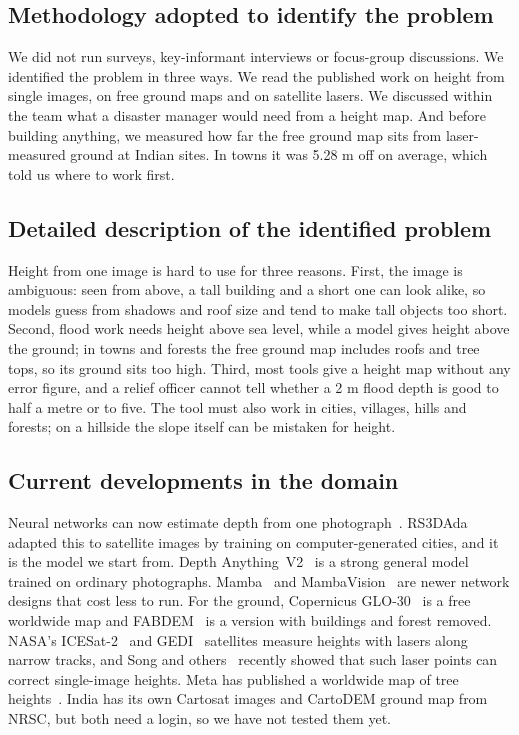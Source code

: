 \documentclass[11pt,a4paper]{article}
\newcommand{\m}{\ifmmode\,\mathrm{m}\else\,m\fi}
\begin{document}
\subsection{Methodology adopted to identify the problem}
We did not run surveys, key-informant interviews or focus-group discussions. We identified the problem in three ways. We read the published work on height from single images, on free ground maps and on satellite lasers. We discussed within the team what a disaster manager would need from a height map. And before building anything, we measured how far the free ground map sits from laser-measured ground at Indian sites. In towns it was 5.28\m{} off on average, which told us where to work first.

\subsection{Detailed description of the identified problem}
Height from one image is hard to use for three reasons. First, the image is ambiguous: seen from above, a tall building and a short one can look alike, so models guess from shadows and roof size and tend to make tall objects too short. Second, flood work needs height above sea level, while a model gives height above the ground; in towns and forests the free ground map includes roofs and tree tops, so its ground sits too high. Third, most tools give a height map without any error figure, and a relief officer cannot tell whether a 2\m{} flood depth is good to half a metre or to five.
The tool must also work in cities, villages, hills and forests; on a hillside the slope itself can be mistaken for height.

\subsection{Current developments in the domain}
Neural networks can now estimate depth from one photograph~\cite{ranftl2021dpt}. RS3DAda~\cite{song2024synrs3d} adapted this to satellite images by training on computer-generated cities, and it is the model we start from. Depth Anything~V2~\cite{yang2024dav2} is a strong general model trained on ordinary photographs. Mamba~\cite{gu2023mamba} and MambaVision~\cite{hatamizadeh2025mambavision} are newer network designs that cost less to run. For the ground, Copernicus GLO-30~\cite{esa2021glo30} is a free worldwide map and FABDEM~\cite{hawker2022fabdem} is a version with buildings and forest removed. NASA's ICESat-2~\cite{neumann2019icesat2,neuenschwander2019atl08} and GEDI~\cite{dubayah2020gedi} satellites measure heights with lasers along narrow tracks, and Song and others~\cite{song2025sparse} recently showed that such laser points can correct single-image heights. Meta has published a worldwide map of tree heights~\cite{tolan2024canopy}. India has its own Cartosat images and CartoDEM ground map from NRSC, but both need a login, so we have not tested them yet.
\end{document}
